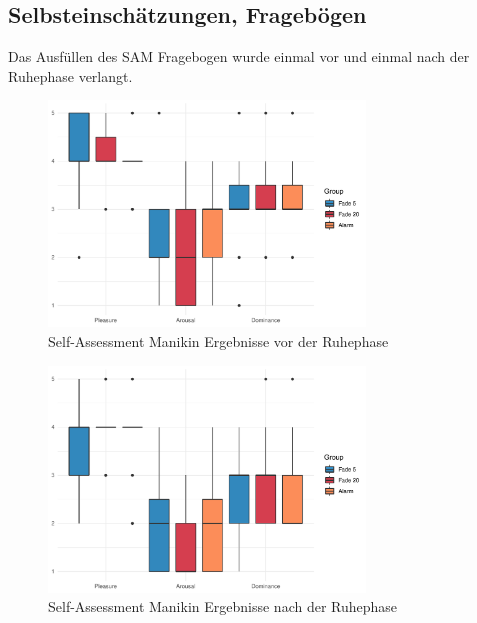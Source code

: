\subsection{Selbsteinschätzungen, Fragebögen}


Das Ausfüllen des SAM Fragebogen wurde einmal vor und einmal nach der Ruhephase verlangt. 

\begin{figure}[H]
	\centering
	\includegraphics[width=0.75\textwidth]{./_StudyResults/SAMpre}
	\caption{Self-Assessment Manikin Ergebnisse vor der Ruhephase}
	\label{fig:samPre}
\end{figure}
\begin{figure}[H]
	\centering
	\includegraphics[width=0.75\textwidth]{./_StudyResults/SAMpost}
	\caption{Self-Assessment Manikin Ergebnisse nach der Ruhephase}
	\label{fig:samPost}
\end{figure}


